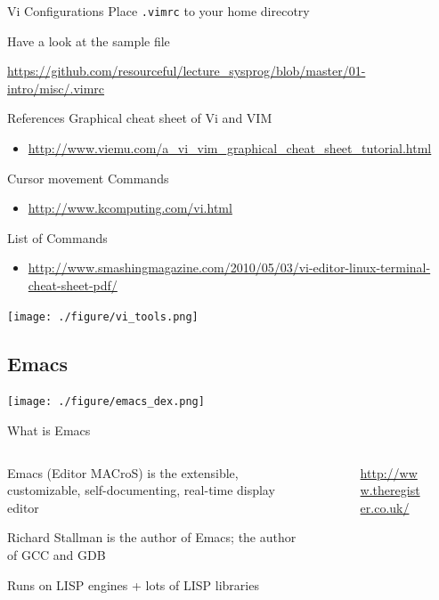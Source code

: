 \documentclass[newPxFont,sthlmFooter,nooffset]{beamer}
\begin{document}
\begin{frame}[t]{Vi Configurations}
Place \texttt{.vimrc} to your home direcotry

\bigskip
Have a look at the sample file

\url{https://github.com/resourceful/lecture_sysprog/blob/master/01-intro/misc/.vimrc}
\end{frame}

\begin{frame}[t]{References}
Graphical cheat sheet of Vi and VIM
\begin{itemize}
\item \url{http://www.viemu.com/a_vi_vim_graphical_cheat_sheet_tutorial.html}
\end{itemize}

Cursor movement Commands
\begin{itemize}
\item \url{http://www.kcomputing.com/vi.html}
\end{itemize}

List of Commands
\begin{itemize}
\item \url{http://www.smashingmagazine.com/2010/05/03/vi-editor-linux-terminal-cheat-sheet-pdf/}
\end{itemize}

\bigskip\centering
\texttt{[image: ./figure/vi\_tools.png]}
\end{frame}




\subsection{Emacs}

\begin{frame}[t]{}
\centering
\texttt{[image: ./figure/emacs\_dex.png]}
\end{frame}


\begin{frame}[t]{What is Emacs}
\vspace{-1.5em}
\begin{columns}
\begin{column}{.7\linewidth}
Emacs (Editor MACroS) is the extensible, customizable, self-documenting, real-time display editor

\bigskip
Richard Stallman is the author of Emacs; the author of GCC and GDB

\bigskip
Runs on LISP engines + lots of LISP libraries
\end{column}
\begin{column}{.3\linewidth}
\begin{figure}\centering
   {\href{https://regmedia.co.uk/2012/06/12/richard_stallman.jpg}{http://www.theregister.co.uk/}}
\end{figure}
\end{column}
\end{columns}
\end{frame}
\end{document}
